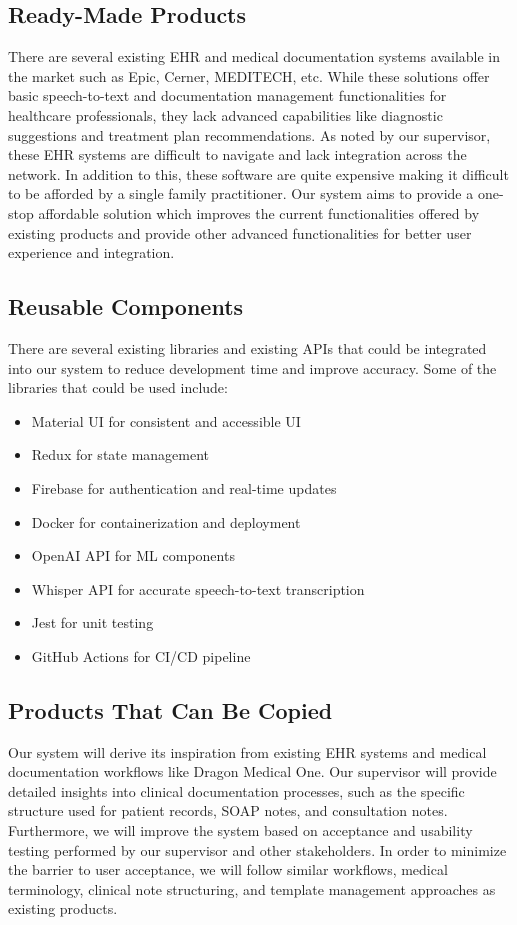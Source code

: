 \documentclass[12pt]{article}
\begin{document}
\subsection{Ready-Made Products}
There are several existing EHR and medical documentation systems available in the market such as Epic, Cerner, MEDITECH, etc. While these solutions offer basic speech-to-text and documentation management functionalities for healthcare professionals, they lack advanced capabilities like diagnostic suggestions and treatment plan recommendations. As noted by our supervisor, these EHR systems are difficult to navigate and lack integration across the network. In addition to this, these software are quite expensive making it difficult to be afforded by a single family practitioner. Our system aims to provide a one-stop affordable solution which improves the current functionalities offered by existing products and provide other advanced functionalities for better user experience and integration.

\subsection{Reusable Components}
There are several existing libraries and existing APIs that could be integrated into our system to reduce development time and improve accuracy. Some of the libraries that could be used include:

\begin{itemize}
  \item Material UI for consistent and accessible UI
  \item Redux for state management
  \item Firebase for authentication and real-time updates
  \item Docker for containerization and deployment
  \item OpenAI API for ML components
  \item Whisper API for accurate speech-to-text transcription
  \item Jest for unit testing
  \item GitHub Actions for CI/CD pipeline 
\end{itemize}

\subsection{Products That Can Be Copied}
Our system will derive its inspiration from existing EHR systems and medical documentation workflows like Dragon Medical One. Our supervisor will provide detailed insights into clinical documentation processes, such as the specific structure used for patient records, SOAP notes, and consultation notes. Furthermore, we will improve the system based on acceptance and usability testing performed by our supervisor and other stakeholders. In order to minimize the barrier to user acceptance, we will follow similar workflows, medical terminology, clinical note structuring, and template management approaches as existing products.
\end{document}
